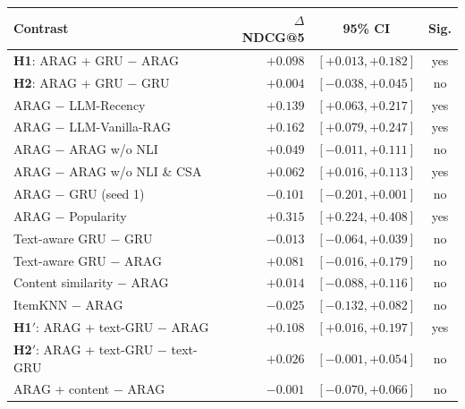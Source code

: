 \begin{tabular}{lrcc}
\toprule
Contrast & $\Delta$NDCG@5 & 95\% CI & Sig. \\
\midrule
\textbf{H1}: ARAG + GRU $-$ ARAG & $+0.098$ & $[+0.013, +0.182]$ & yes \\
\textbf{H2}: ARAG + GRU $-$ GRU & $+0.004$ & $[-0.038, +0.045]$ & no \\
ARAG $-$ LLM-Recency & $+0.139$ & $[+0.063, +0.217]$ & yes \\
ARAG $-$ LLM-Vanilla-RAG & $+0.162$ & $[+0.079, +0.247]$ & yes \\
ARAG $-$ ARAG w/o NLI & $+0.049$ & $[-0.011, +0.111]$ & no \\
ARAG $-$ ARAG w/o NLI \& CSA & $+0.062$ & $[+0.016, +0.113]$ & yes \\
ARAG $-$ GRU (seed 1) & $-0.101$ & $[-0.201, +0.001]$ & no \\
ARAG $-$ Popularity & $+0.315$ & $[+0.224, +0.408]$ & yes \\
\midrule
Text-aware GRU $-$ GRU & $-0.013$ & $[-0.064, +0.039]$ & no \\
Text-aware GRU $-$ ARAG & $+0.081$ & $[-0.016, +0.179]$ & no \\
Content similarity $-$ ARAG & $+0.014$ & $[-0.088, +0.116]$ & no \\
ItemKNN $-$ ARAG & $-0.025$ & $[-0.132, +0.082]$ & no \\
\textbf{H1$'$}: ARAG + text-GRU $-$ ARAG & $+0.108$ & $[+0.016, +0.197]$ & yes \\
\textbf{H2$'$}: ARAG + text-GRU $-$ text-GRU & $+0.026$ & $[-0.001, +0.054]$ & no \\
ARAG + content $-$ ARAG & $-0.001$ & $[-0.070, +0.066]$ & no \\
\bottomrule
\end{tabular}
